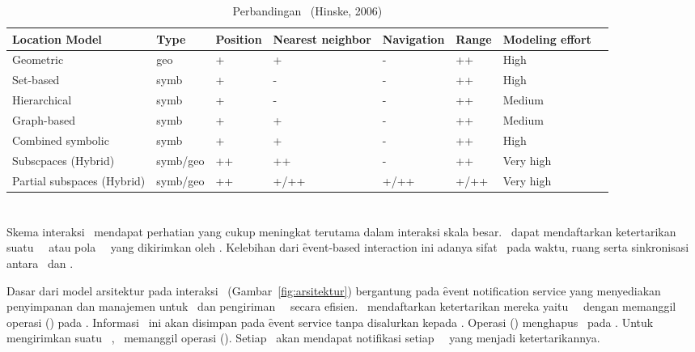 \begin{table}
  \centering\scriptsize
  \caption{Perbandingan \locationmodel~(Hinske, 2006)}
  \label{tab:locationmodel}
  \begin{tabular}
    {l >{\centering\arraybackslash}p{1.6cm}
      >{\centering\arraybackslash}p{0.6cm}
      >{\centering\arraybackslash}p{0.8cm}
      >{\centering\arraybackslash}p{1.8cm}
      >{\centering\arraybackslash}p{0.6cm}
      >{\centering\arraybackslash}p{0.6cm}
      >{\centering\arraybackslash}p{1cm}}
    \hline
    Location Model& Type& Position& Nearest neighbor& Navigation& Range&
    Modeling effort \\
    \hline
    Geometric                  & geo      & + & + & - & ++ & High \\
    Set-based                  & symb     & + & - & - & ++ & High \\
    Hierarchical               & symb     & + & - & - & ++ & Medium \\
    Graph-based                & symb     & + & + & - & ++ & Medium \\
    Combined symbolic          & symb     & + & + & - & ++ & High \\
    Subscpaces (Hybrid)        & symb/geo & ++ & ++ & - & ++ & Very high \\
    Partial subspaces (Hybrid) & symb/geo & ++ & +/++ & +/++ & +/++ & Very high \\
    \hline
  \end{tabular}
\end{table}

\section{\PubSub}

Skema interaksi \pubsub~mendapat perhatian yang cukup meningkat terutama dalam
interaksi skala besar. \Subscriber~dapat mendaftarkan ketertarikan suatu
\event~\pubsub~atau pola \event~\pubsub~yang dikirimkan oleh \publisher.
Kelebihan dari \f{event-based interaction} ini adanya sifat \decoupling~pada
waktu, ruang serta sinkronisasi antara \publisher~dan \subscriber.

Dasar dari model arsitektur pada interaksi
\pubsub~(Gambar~\ref{fig:arsitektur}) bergantung pada \f{event notification
service} yang menyediakan penyimpanan dan manajemen untuk \subscription~dan
pengiriman \event~\pubsub~secara efisien. \Subscriber~mendaftarkan ketertarikan
mereka yaitu \event~\pubsub~dengan memanggil operasi \subscribe() pada
\eventservice. Informasi \subscription~ini akan disimpan pada \f{event service}
tanpa disalurkan kepada \publisher. Operasi \unsubscribe() menghapus
\subscription~pada \eventservice. Untuk mengirimkan suatu \event~\pubsub,
\publisher~memanggil operasi \publish(). Setiap \subscriber~akan mendapat
notifikasi setiap \event~\pubsub~yang menjadi ketertarikannya.

